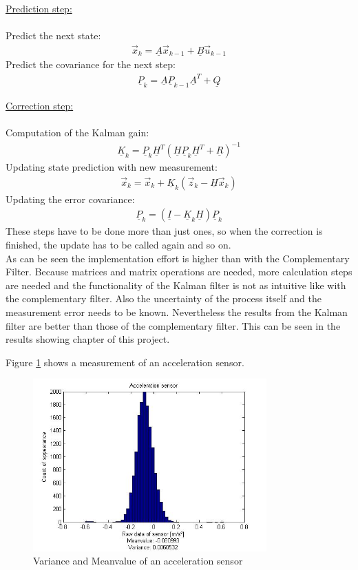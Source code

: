 \underline{Prediction step:}\\\\
Predict the next state:
\begin{align}
\vec x_k = \underline{A}\vec x_{k-1}+\underline{B}\vec u_{k-1}
\label{equ:Kalman1}
\end{align}
Predict the covariance for the next step:
\begin{align}
\underline{P}_k = \underline{A}\underline{P}_{k-1}\underline{A}^T+\underline{Q}
\label{equ:Kalman2}
\end{align}

\underline{Correction step:}\\\\
Computation of the Kalman gain:
\begin{align}
\underline{K}_k = \underline{P}_k	\underline{H}^T(\underline{H}\underline{P}_k\underline{H}^T+\underline{R})^{-1}
\label{equ:Kalman3}
\end{align}
Updating state prediction with new measurement:
\begin{align}
\vec x_k = 	\vec x_k+\underline{K}_k(\vec z_k-\underline{H}\vec x_k)
\label{equ:Kalman4}
\end{align}
Updating the error covariance:
\begin{align}
\underline{P}_k = (\underline{I}-\underline{K}_k\underline{H})\underline{P}_k	
\label{equ:Kalman5}
\end{align}
These steps have to be done more than just ones, so when the correction is finished, the update has to be called again and so on.\\
As can be seen the implementation effort is higher than with the Complementary Filter. Because matrices and matrix operations are needed, more calculation steps are needed and the functionality of the Kalman filter is not as intuitive like with the complementary filter. Also the uncertainty of the process itself and the measurement error needs to be known. Nevertheless the results from the Kalman filter are better than those of the complementary filter. This can be seen in the results showing chapter of this project.

Figure \ref{fig:measurement} shows a measurement of an acceleration sensor.
\begin{figure}[H]
	\centering\includegraphics[width=0.8\textwidth]{fig/Kal_Comp/AccX.jpg}
	\caption{Variance and Meanvalue of an acceleration sensor}
	\label{fig:measurement}
\end{figure}


